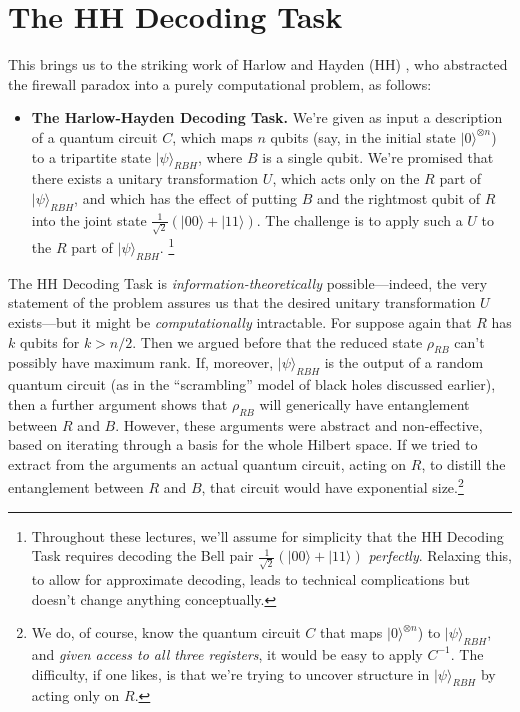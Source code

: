 \documentclass[12pt]{report}
\theoremstyle{plain}
\theoremstyle{definition}
\renewcommand{\ket}[1]{|#1\rangle}
\newcommand{\tensor}{\otimes}
\begin{document}
\section{The HH Decoding Task}

This brings us to the striking work of Harlow and Hayden (HH) \cite{harlowhayden}, who abstracted
the firewall paradox into a purely computational problem, as follows:

\begin{itemize}
\item \textbf{The Harlow-Hayden Decoding Task.}  We're given as input a description of a quantum circuit $C$, which
maps $n$ qubits (say, in the initial state $\ket{0}^{\tensor n}$) to a tripartite state $\ket{\psi}_{RBH}$, where $B$ is
a single qubit.  We're promised
that there exists a unitary transformation $U$, which acts only on the $R$ part of $\ket{\psi}_{RBH}$, and which has the effect
of putting $B$ and the rightmost qubit of $R$
into the joint state $\frac{1}{\sqrt{2}}(\ket{00}+\ket{11})$.  The challenge is to apply such a $U$ to the $R$ part of $\ket{\psi}_{RBH}$.
\footnote{Throughout these lectures, we'll assume for simplicity that the HH Decoding Task requires decoding the Bell pair $\frac{1}{\sqrt{2}}(\ket{00}+\ket{11})$ {\em perfectly}.  Relaxing this, to allow for approximate decoding, leads to technical complications but doesn't
change anything conceptually.}
\end{itemize}

The HH Decoding Task is {\em information-theoretically} possible---indeed, the very statement of the problem assures us that the desired unitary transformation $U$ exists---but it might be {\em computationally} intractable.  For suppose again that $R$ has $k$ qubits for $k>n/2$.  Then
we argued before that the reduced state $\rho_{RB}$ can't possibly have maximum rank.  If, moreover, $\ket{\psi}_{RBH}$ is the output of a random quantum circuit (as in the ``scrambling'' model of black holes discussed earlier), then a further argument shows that $\rho_{RB}$ will generically have entanglement between $R$ and $B$.  However, these arguments were abstract and non-effective, based on iterating through a basis for the whole Hilbert space.  If we tried to extract from the arguments an actual quantum circuit, acting on $R$, to distill the entanglement between $R$ and $B$, that circuit would have exponential size.\footnote{We do, of course, know the quantum circuit $C$ that maps $\ket{0}^{\tensor n}$) to $\ket{\psi}_{RBH}$, and {\em given access to all three registers}, it would be easy to apply $C^{-1}$.  The difficulty, if one likes, is that we're trying to uncover structure in $\ket{\psi}_{RBH}$ by acting only on $R$.}
\end{document}
